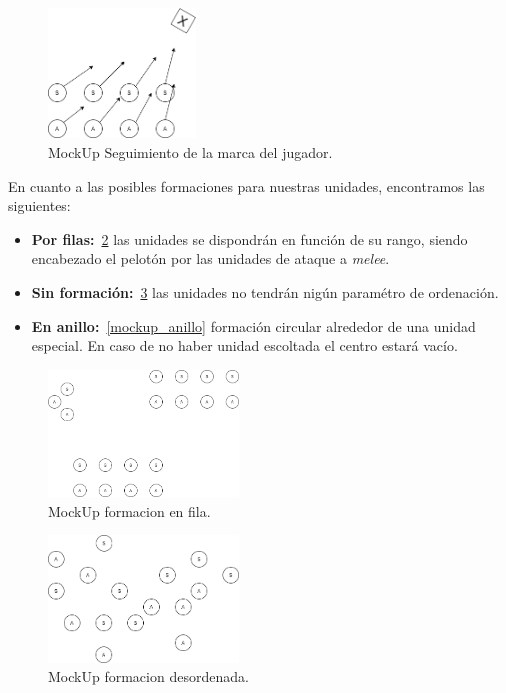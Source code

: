 \begin{figure}[ht]
\centering
\includegraphics[width=0.35\textwidth]{imagenes/gdd/Following.png}
\caption{MockUp Seguimiento de la marca del jugador.}
\label{fig:mockup_following}
\end{figure}

En cuanto a las posibles formaciones para nuestras unidades, encontramos las siguientes:

\begin{itemize}
\item \textbf{Por filas:}~\ref{mockup_en_fila} las unidades se dispondrán en función de su rango,
siendo encabezado el pelotón por las unidades de ataque a \textit{melee}.

\item \textbf{Sin formación:}~\ref{mockup_desordenada} las unidades no tendrán nigún paramétro de ordenación.

\item \textbf{En anillo:}~\ref{mockup_anillo} formación circular alrededor de una unidad especial. En caso de
no haber unidad escoltada el centro estará vacío. 
\end{itemize} 

\begin{figure}[ht]
\centering
\includegraphics[width=0.45\textwidth]{imagenes/gdd/Formacion-en-fila.png}
\caption{MockUp formacion en fila.}
\label{mockup_en_fila}
\end{figure}

\begin{figure}[ht]
\centering
\includegraphics[width=0.45\textwidth]{imagenes/gdd/Formacion-desordenada.png}
\caption{MockUp formacion desordenada.}
\label{mockup_desordenada}
\end{figure}

